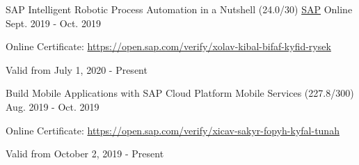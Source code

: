 
\begin{cventries}

\vspace{-0.25cm}

  \cventry
    {SAP Intelligent Robotic Process Automation in a Nutshell (24.0/30)} %
    {\href{https://www.sap.com/index.html}{SAP}} %
    {Online} %
    {Sept. 2019 - Oct. 2019} %
    {
	    \begin{cvitems} %
        \item[] {Online Certificate: \url{https://open.sap.com/verify/xolav-kibal-bifaf-kyfid-rysek}} %
        \item[] {Valid from July 1, 2020 - Present} %
      \end{cvitems}
    }
    \vspace{-0.1cm}
  \cventry
    {Build Mobile Applications with SAP Cloud Platform Mobile Services (227.8/300)} %
    {} %
    {} %
    {Aug. 2019 - Oct. 2019} %
    {
	    \begin{cvitems} %
        \item[] {Online Certificate: \url{https://open.sap.com/verify/xicav-sakyr-fopyh-kyfal-tunah}} %
        \item[] {Valid from October 2, 2019 - Present} %
      \end{cvitems}
    }
    \vspace{-0.1cm}

\end{cventries}
